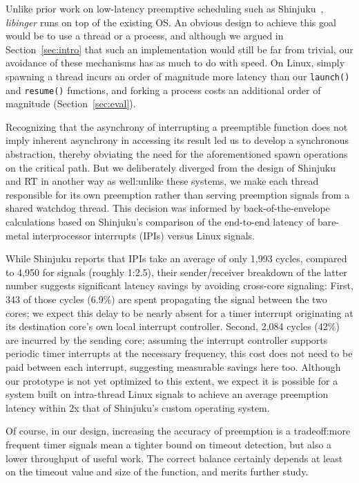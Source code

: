 Unlike prior work on low-latency preemptive scheduling such as
Shinjuku~\cite{Kaffes:nsdi2019}, \textit{libinger} runs on top of the existing
OS.  An obvious design to achieve this goal would be to use a thread or a process,
and although we argued in Section~\ref{sec:intro} that such an implementation would
still be far from trivial, our avoidance of these mechanisms has as much to do with
speed.  On Linux, simply spawning a thread incurs an order of magnitude more latency
than our \texttt{launch()} and \texttt{resume()} functions, and forking a process
costs an additional order of magnitude (Section~\ref{sec:eval}).

Recognizing that the asynchrony of interrupting a preemptible function does not imply
inherent asynchrony in accessing its result led us to develop a synchronous
abstraction, thereby obviating the need for the aforementioned spawn operations on
the critical path.  But we deliberately diverged from the design of Shinjuku and RT
in another way as well:\@ unlike these systems, we make each thread responsible for
its own preemption rather than serving preemption signals from a shared watchdog
thread.  This decision was informed by back-of-the-envelope calculations based on
Shinjuku's comparison of the end-to-end latency of bare-metal interprocessor
interrupts (IPIs) versus Linux signals.

While Shinjuku reports that IPIs take an average of only 1,993 cycles, compared to
4,950 for signals (roughly 1:2.5), their sender/receiver breakdown of the latter
number suggests significant latency savings by avoiding cross-core signaling:
First, 343 of those cycles (6.9\%) are spent propagating the signal between the two
cores; we expect this delay to be nearly absent for a timer interrupt originating at
its destination core's own local interrupt controller.  Second, 2,084 cycles (42\%)
are incurred by the sending core; assuming the interrupt controller supports
periodic timer interrupts at the necessary frequency, this cost does not need to be
paid between each interrupt, suggesting measurable savings here too.  Although
our prototype is not yet optimized to this extent, we expect it is possible for a
system built on intra-thread Linux signals to achieve an average preemption latency
within 2x that of Shinjuku's custom operating system.

Of course, in our design, increasing the accuracy of preemption is a tradeoff:\@ more
frequent timer signals mean a tighter bound on timeout detection, but also a lower
throughput of useful work.  The correct balance certainly depends at least on the
timeout value and size of the function, and merits further study.


